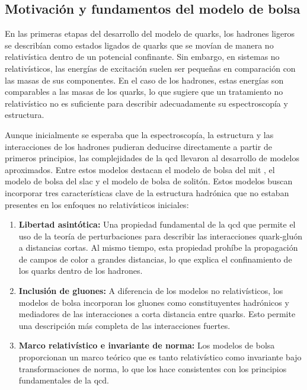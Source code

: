 \subsection{Motivación y fundamentos del modelo de bolsa}

En las primeras etapas del desarrollo del modelo de quarks, los hadrones ligeros se describían como estados ligados de quarks que se movían de manera no relativística dentro de un potencial confinante. Sin embargo, en sistemas no relativísticos, las energías de excitación suelen ser pequeñas en comparación con las masas de sus componentes. En el caso de los hadrones, estas energías son comparables a las masas de los quarks, lo que sugiere que un tratamiento no relativístico no es suficiente para describir adecuadamente su espectroscopía y estructura. %

Aunque inicialmente se esperaba que la espectroscopía, la estructura y las interacciones de los hadrones pudieran deducirse directamente a partir de primeros principios, las complejidades de la \acrshort{qcd} llevaron al desarrollo de modelos aproximados. Entre estos modelos destacan el modelo de bolsa del \acrshort{mit} %
, el modelo de bolsa del \acrfull{slac} y el modelo de bolsa de solitón. Estos modelos buscan incorporar tres características clave de la estructura hadrónica que no estaban presentes en los enfoques no relativísticos iniciales:

\renewcommand{\labelenumi}{\alph{enumi})}

\begin{enumerate}
\item \textbf{Libertad asintótica:} Una propiedad fundamental de la \acrshort{qcd} que permite el uso de la teoría de perturbaciones para describir las interacciones quark-gluón a distancias cortas. Al mismo tiempo, esta propiedad prohíbe la propagación de campos de color a grandes distancias, lo que explica el confinamiento de los quarks dentro de los hadrones. %
\item \textbf{Inclusión de gluones:}  A diferencia de los modelos no relativísticos, los modelos de bolsa incorporan los gluones como constituyentes hadrónicos y mediadores de las interacciones a corta distancia entre quarks. Esto permite una descripción más completa de las interacciones fuertes. %
\item \textbf{Marco relativístico e invariante de norma:} Los modelos de bolsa proporcionan un marco teórico que es tanto relativístico como invariante bajo transformaciones de norma, lo que los hace consistentes con los principios fundamentales de la \acrshort{qcd}. %

\end{enumerate}

